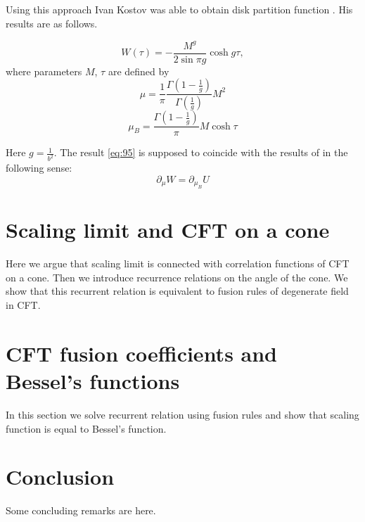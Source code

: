 \documentclass[12pt]{article}
\begin{document}
Using this approach Ivan Kostov was able to obtain disk partition function
\cite{kostov2004boundary,kostov2003boundary}. His results are as follows. 

\begin{equation}
  \label{eq:95}
  W(\tau) = -\frac{M^{g}}{2\sin \pi g} \cosh g\tau,
\end{equation}
where parameters $M$, $\tau$ are defined by
\begin{equation}
  \label{eq:96}
  \mu=\frac{1}{\pi} \frac{\Gamma\left(1-\frac{1}{g}\right)}{\Gamma\left(\frac{1}{g}\right)} M^{2}
\end{equation}
\begin{equation}
  \label{eq:97}
  \mu_{B}=\frac{\Gamma\left(1-\frac{1}{g}\right)}{\pi} M\cosh \tau
\end{equation}

Here $g=\frac{1}{b^{2}}$. The result \eqref{eq:95} is supposed to coincide with the results of
\cite{fateev2000boundary} in the following sense:
\begin{equation}
  \label{eq:98}
  \partial_{\mu} W = \partial_{\mu_{B}} U
\end{equation}


\section{Scaling limit and CFT on a cone}
\label{sec:scaling-limit-cft}

Here we argue that scaling limit is connected with correlation
functions of CFT on a cone. Then we introduce recurrence relations on
the angle of the cone. We show that this recurrent relation is
equivalent to fusion rules of degenerate field in CFT. 


\section{CFT fusion coefficients and Bessel's functions}
\label{sec:cft-fusi-coeff}

In this section we solve recurrent relation using fusion rules and
show that scaling function is equal to Bessel's function. 

\section{Conclusion}
\label{sec:conclusion}
Some concluding remarks are here. 

{} 

\end{document}
